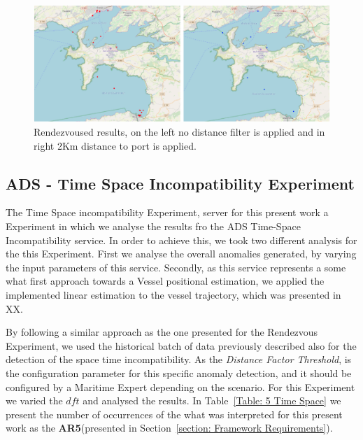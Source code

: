 \begin{figure}[H]
	\centering
	\includegraphics[scale = .8]{figures/Ch5/ThesisExpRend.pdf}
    \caption{Rendezvoused results, on the left no distance filter is applied and in right 2Km distance to port is applied.}
    \label{fig: Chapter 5 Rend2Mapsr}
\end{figure}



\subsection{ADS - Time Space Incompatibility Experiment}
\label{subsection: ADS - Time Space Incompatibility Experiment}
The Time Space incompatibility Experiment, server for this present work a Experiment in which we analyse the results fro the ADS Time-Space Incompatibility service. In order to achieve this, we took two different analysis for the this Experiment. First we analyse the overall anomalies generated, by varying the input parameters of this service. Secondly, as this service represents a some what first approach towards a Vessel positional estimation, we applied the implemented linear estimation to the vessel trajectory, which was presented in XX.

By following a similar approach as the one presented for the Rendezvous Experiment, we used the historical batch of data previously described also for the detection of the space time incompatibility. As the \emph{Distance Factor Threshold}, is the configuration parameter for this specific anomaly detection, and it should be configured by a Maritime Expert depending on the scenario. For this Experiment we varied the $dft$ and analysed the results.  In Table~\ref{Table: 5 Time Space} we present the number of occurrences of the what was interpreted for this present work as the \textbf{AR5}(presented in Section~\ref{section: Framework Requirements}). 

